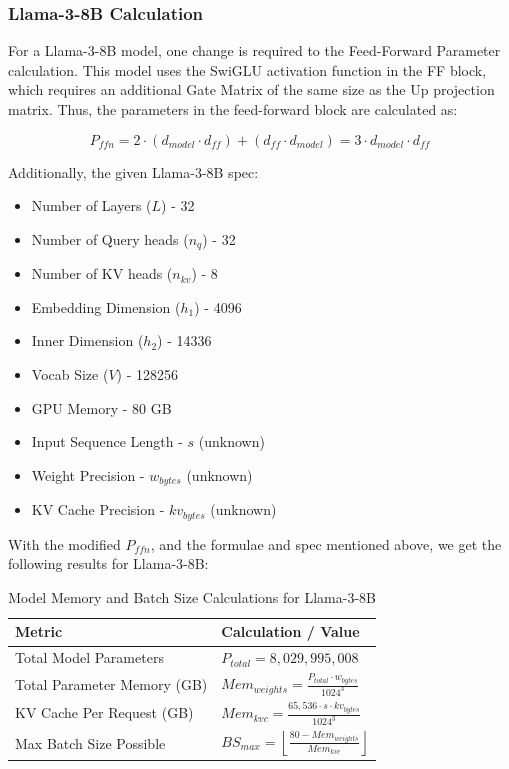 \documentclass{article}
\begin{document}
\subsubsection{Llama-3-8B Calculation}

For a Llama-3-8B model, one change is required to the Feed-Forward Parameter calculation. This model uses the SwiGLU activation function in the FF block, which requires an additional Gate Matrix of the same size as the Up projection matrix. Thus, the parameters in the feed-forward block are calculated as:

$$P_{ffn} = 2 \cdot (d_{model} \cdot d_{ff}) + (d_{ff} \cdot d_{model}) = 3 \cdot d_{model} \cdot d_{ff}$$

Additionally, the given Llama-3-8B spec:

\begin{itemize}
    \item Number of Layers ($L$) - 32
    \item Number of Query heads ($n_q$) - 32
    \item Number of KV heads ($n_{kv}$) - 8
    \item Embedding Dimension ($h_1$) - 4096
    \item Inner Dimension ($h_2$) - 14336
    \item Vocab Size ($V$) - 128256
    \item GPU Memory - 80 GB
    \item Input Sequence Length - $s$ (unknown)
    \item Weight Precision - $w_{bytes}$ (unknown)
    \item KV Cache Precision - $kv_{bytes}$ (unknown)
\end{itemize}

\vspace{0.2cm}

With the modified $P_{ffn}$, and the formulae and spec mentioned above, we get the following results for Llama-3-8B:

\begin{table}[h]
\centering
\renewcommand{\arraystretch}{2.2} %
\begin{tabular}{|l|l|}
\hline
\textbf{Metric} & \textbf{Calculation / Value} \\ \hline
Total Model Parameters & $P_{total} = 8,029,995,008$ \\ \hline
Total Parameter Memory (GB) & $\displaystyle Mem_{weights} = \frac{P_{total} \cdot w_{bytes}}{1024^3}$ \\ \hline
KV Cache Per Request (GB) & $\displaystyle Mem_{kvc} = \frac{65,536 \cdot s \cdot kv_{bytes}}{1024^3}$ \\ \hline
Max Batch Size Possible & $\displaystyle BS_{max} = \left\lfloor \frac{80 - Mem_{weights}}{Mem_{kvc}} \right\rfloor$ \\ \hline
\end{tabular}
\caption{Model Memory and Batch Size Calculations for Llama-3-8B}
\end{table}
\end{document}
